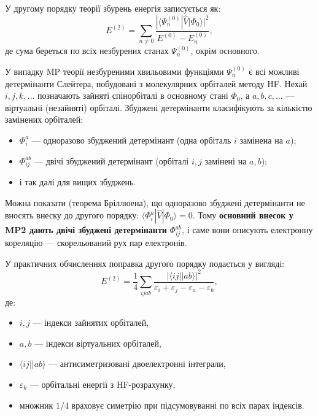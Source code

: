 У другому порядку теорії збурень енергія записується як:
\begin{equation}\label{eq:MP2energy_general}
    E^{(2)} = \sum_{n \neq 0} \frac{|\langle \Psi_n^{(0)} | \hat{V} | \Phi_0 \rangle|^2}{E^{(0)} - E_n^{(0)}},
\end{equation}
де сума береться по всіх незбурених станах \(\Psi_n^{(0)}\), окрім основного.

У випадку MP теорії незбуреними хвильовими функціями \(\Psi_n^{(0)}\) є всі можливі детермінанти Слейтера,
побудовані з молекулярних орбіталей методу HF. Нехай \(i, j, k, \ldots\) позначають зайняті спінорбіталі
в основному стані \(\Phi_0\), а \(a, b, c, \ldots\) --- віртуальні (незайняті) орбіталі.
Збуджені детермінанти класифікують за кількістю замінених орбіталей:
\begin{itemize}
    \item \(\Phi_i^a\) --- одноразово збуджений детермінант (одна орбіталь \(i\) замінена на \(a\));
    \item \(\Phi_{ij}^{ab}\) --- двічі збуджений детермінант (орбіталі \(i, j\) замінені на \(a, b\));
    \item і так далі для вищих збуджень.
\end{itemize}

Можна показати (теорема Бріллюена), що одноразово збуджені детермінанти не вносять внеску до другого порядку:
\(\langle \Phi_i^a | \hat{V} | \Phi_0 \rangle = 0\).
Тому \textbf{основний внесок у MP2 дають двічі збуджені детермінанти} \(\Phi_{ij}^{ab}\),
і саме вони описують електронну кореляцію --- скорельований рух пар електронів.

У практичних обчисленнях поправка другого порядку подається у вигляді:
\begin{equation}\label{eq:MP2energy}
    E^{(2)} = \frac{1}{4}
    \sum_{ijab}
    \frac{|\langle ij || ab \rangle|^2}
    {\varepsilon_i + \varepsilon_j - \varepsilon_a - \varepsilon_b},
\end{equation}
де:
\begin{itemize}
    \item \(i,j\) --- індекси зайнятих орбіталей,
    \item \(a,b\) --- індекси віртуальних орбіталей,
    \item \(\langle ij || ab \rangle\) --- антисиметризовані двоелектронні інтеграли,
    \item \(\varepsilon_k\) --- орбітальні енергії з HF-розрахунку,
    \item множник \(1/4\) враховує симетрію при підсумовуванні по всіх парах індексів.
\end{itemize}

